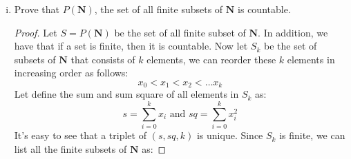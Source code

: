 \documentclass[10pt,letterpaper]{article}
\begin{document}
\begin{enumerate}[(i)]
\begin{proof}
\begin{center}
	\end{center}		
	The bijection mapping above indeed map each element in the union to the set of natural number $\mathbf{N}$ \\
	\begin{center}
	\begin{tabular}{cccccccc}
		$a_{11}$ & $a_{12}$ & $a_{21}$ & $a_{31}$ & $a_{22}$ & $a_{13}$ & $a_{14}$ & $\ldots$ \\
		$\updownarrow$ & $\updownarrow$ & $\updownarrow$ & $\updownarrow$ & $\updownarrow$ & $\updownarrow$ & $\updownarrow$ & \\
		$1$ & $2$ & $3$ & $3$ & $4$ & $5$ & $6$ & $\ldots$
	\end{tabular}
	\end{center}
	Therefore $X$ is countable.
\end{proof}	
	
\item Prove that $P(\mathbf{N})$, the set of all finite subsets of $\mathbf{N}$ is countable.
\begin{proof}
			
		Let $S = P(\mathbf{N})$ be the set of all finite subset of $\mathbf{N}$. In addition, 
		we have that if a set is finite, then it is countable. Now let $S_k$ be the set of subsets of $\mathbf{N}$
		that consists of $k$ elements, we can reorder these $k$ elements in increasing order as follows:
		$$x_0 < x_1 < x_2 < \ldots x_k$$
		Let define the sum and sum square of all elements in $S_k$ as:
		$$s = \displaystyle\sum_{i=0}^{k}x_i \text{ and } 
			sq = \displaystyle\sum_{i=0}^{k}x_i^2$$
		It's easy to see that a triplet of $(s, sq, k)$ is unique. 
		Since $S_k$ is finite, we can list all the finite subsets of $\mathbf{N}$ as:
	\end{proof}
\end{enumerate}
	
\end{document}
